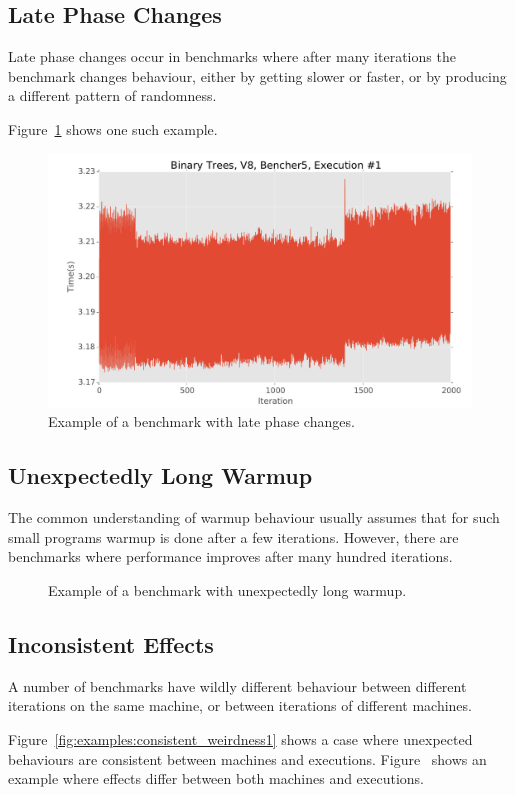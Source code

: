 \documentclass[10pt,preprint]{sigplanconf}
\begin{document}
\subsection{Late Phase Changes}
\label{sub:phase}

Late phase changes occur in benchmarks where after many iterations the benchmark
changes behaviour, either by getting slower or faster, or by producing a
different pattern of randomness.

Figure~\ref{fig:examples:late1} shows one such example.

\begin{figure}[h!]
\centering
\includegraphics[width=.46\textwidth]{examples/late1}
\caption{Example of a benchmark with late phase changes.}
\label{fig:examples:late1}
\end{figure}


\subsection{Unexpectedly Long Warmup}
\label{sub:long}

The common understanding of warmup behaviour usually assumes that for such
small programs warmup is done after a few iterations. However, there are
benchmarks where performance improves after many hundred iterations.

\begin{figure}[h!]
\centering
{}
\caption{Example of a benchmark with unexpectedly long warmup.}
\label{fig:examples:long}
\end{figure}

\subsection{Inconsistent Effects}
\label{sub:inconsistent}

A number of benchmarks have wildly different behaviour between different
iterations on the same machine, or between iterations of different machines.

Figure~\ref{fig:examples:consistent_weirdness1} shows a case where
unexpected behaviours are consistent between machines and executions.
Figure~\label{fig:examples:inconsistent_weirdness1} shows an example where
effects differ between both machines and executions.
\end{document}
